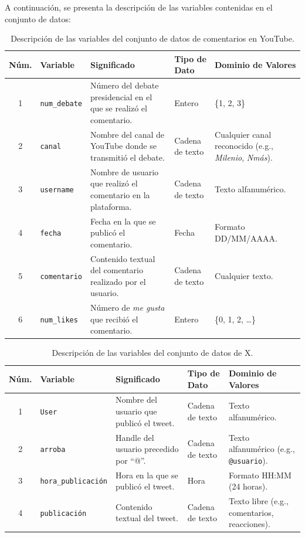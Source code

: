 \documentclass[10pt, a4paper]{article}
\begin{document}
	A continuación, se presenta la descripción de las variables contenidas en el conjunto de datos:
	\begin{table}[H]
		\centering
		\begin{tabular}{|c|l|p{6cm}|l|p{4cm}|}
			\hline
			\textbf{Núm.} & \textbf{Variable} & \textbf{Significado} & \textbf{Tipo de Dato} & \textbf{Dominio de Valores} \\
			\hline
			1 & \texttt{num\_debate} & Número del debate presidencial en el que se realizó el comentario. & Entero & \{1, 2, 3\} \\
			\hline
			2 & \texttt{canal} & Nombre del canal de YouTube donde se transmitió el debate. & Cadena de texto & Cualquier canal reconocido (e.g., \textit{Milenio}, \textit{Nmás}). \\
			\hline
			3 & \texttt{username} & Nombre de usuario que realizó el comentario en la plataforma. & Cadena de texto & Texto alfanumérico. \\
			\hline
			4 & \texttt{fecha} & Fecha en la que se publicó el comentario. & Fecha & Formato DD/MM/AAAA. \\
			\hline
			5 & \texttt{comentario} & Contenido textual del comentario realizado por el usuario. & Cadena de texto & Cualquier texto. \\
			\hline
			6 & \texttt{num\_likes} & Número de \textit{me gusta} que recibió el comentario. & Entero & \{0, 1, 2, \dots\} \\
			\hline
			
		\end{tabular}
		\caption{Descripción de las variables del conjunto de datos de comentarios en YouTube.}
		\label{tab:variables_dataset}
	\end{table}
	
	\begin{table}[h]
		\centering
		\begin{tabular}{|c|l|p{5cm}|l|p{4cm}|}
			\hline
			\textbf{Núm.} & \textbf{Variable} & \textbf{Significado} & \textbf{Tipo de Dato} & \textbf{Dominio de Valores} \\
			\hline
			1 & \texttt{User} & Nombre del usuario que publicó el tweet. & Cadena de texto & Texto alfanumérico. \\
			\hline
			2 & \texttt{arroba} & Handle del usuario precedido por ``@''. & Cadena de texto & Texto alfanumérico (e.g., \texttt{@usuario}). \\
			\hline
			3 & \texttt{hora\_publicación} & Hora en la que se publicó el tweet. & Hora & Formato HH:MM (24 horas). \\
			\hline
			4 & \texttt{publicación} & Contenido textual del tweet. & Cadena de texto & Texto libre (e.g., comentarios, reacciones). \\
			\hline
		\end{tabular}
		\caption{Descripción de las variables del conjunto de datos de X.}
		\label{tab:variables_dataset_X}
	\end{table}
	
\end{document}
